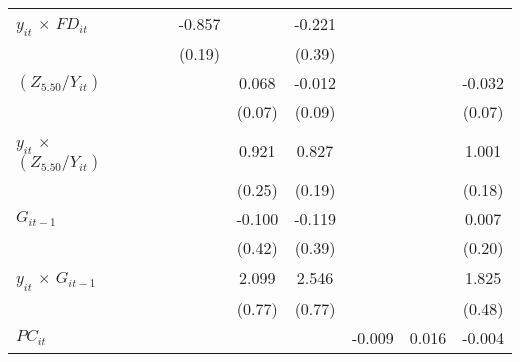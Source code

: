 \documentclass[12pt, a4paper]{article}
\begin{document}
\begin{table}
\begin{threeparttable}
{\begin{tabular}{l*{9}{c}}
				$y_{it}$ $\times$ $FD_{it}$ &                     &                     &                     &      -0.857\sym{***}&                     &      -0.221         &                     &                     &                     \\
				&                     &                     &                     &      (0.19)         &                     &      (0.39)         &                     &                     &                     \\
				$(Z_{5.50}/Y_{it})$          &                     &                     &                     &                     &       0.068         &      -0.012         &                     &                     &      -0.032         \\
				&                     &                     &                     &                     &      (0.07)         &      (0.09)         &                     &                     &      (0.07)         \\
				$y_{it}$ $\times$ $(Z_{5.50}/Y_{it})$&                     &                     &                     &                     &       0.921\sym{***}&       0.827\sym{***}&                     &                     &       1.001\sym{***}\\
				&                     &                     &                     &                     &      (0.25)         &      (0.19)         &                     &                     &      (0.18)         \\
				$G_{it-1}$            &                     &                     &                     &                     &      -0.100         &      -0.119         &                     &                     &       0.007         \\
				&                     &                     &                     &                     &      (0.42)         &      (0.39)         &                     &                     &      (0.20)         \\
				$y_{it}$ $\times$ $G_{it-1}$&                     &                     &                     &                     &       2.099\sym{**} &       2.546\sym{**} &                     &                     &       1.825\sym{***}\\
				&                     &                     &                     &                     &      (0.77)         &      (0.77)         &                     &                     &      (0.48)         \\
				$PC_{it}$                &                     &                     &                     &                     &                     &                     &      -0.009         &       0.016         &      -0.004         \\

\end{tabular}}
\end{threeparttable}
\end{table}
\end{document}
